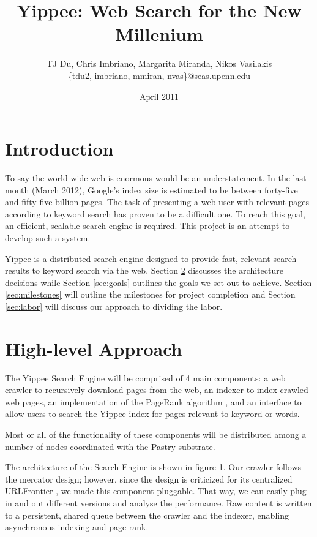 \documentclass[11pt, letterpaper, oneside, twocolumn]{article}
\begin{document}
\title{Yippee: Web Search for the New Millenium}
\author{	TJ Du, Chris Imbriano, Margarita Miranda, Nikos Vasilakis\\
\{tdu2, imbriano, mmiran, nvas\}@seas.upenn.edu}
\date{April 2011}

\maketitle

\section{ Introduction }

To say the world wide web is enormous would be an understatement.  In the last month (March 2012),  Google's index size is estimated to be between forty-five and fifty-five billion pages.\cite{websize} The task of presenting a web user with relevant pages according to keyword search has proven to be a difficult one.\cite{google} To reach this goal, an efficient, scalable search engine is required.  This project is an attempt to develop such a system.

Yippee is a distributed search engine designed to provide fast, relevant search results to keyword search via the web.  Section \ref{sec:approach} discusses the architecture decisions while Section \ref{sec:goals}  outlines the goals we set out to achieve.  Section \ref{sec:milestones} will outline the milestones for project completion and Section \ref{sec:labor} will discuss our approach to dividing the labor.


\section{ High-level Approach }
\label{sec:approach}

The Yippee Search Engine will be comprised of 4 main components: a web crawler to recursively download pages from the web, an indexer to index crawled web pages, an implementation of the PageRank algorithm \cite{pagerank}, and an interface to allow users to search the Yippee index for pages relevant to keyword or words.

Most or all of the functionality of these components will be distributed among a number of nodes coordinated with the Pastry substrate. 

The architecture of the Search Engine  is shown in figure 1. Our crawler
follows the mercator design\cite{mercator}; however, since the design is
criticized for its centralized URLFrontier \cite{ubi,para}, we made this
component pluggable. That  way, we can easily plug in  and out different
versions  and analyse  the  performance.  Raw content  is  written to  a
persistent, shared queue  between the crawler and  the indexer, enabling
asynchronous indexing and page-rank.
\end{document}
